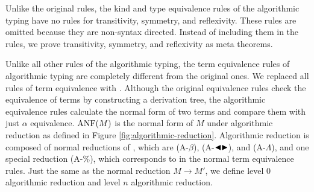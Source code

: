 \begin{center}
    {\small
     \hfil
    }
\end{center}


Unlike the original rules, the kind and type equivalence rules of the
algorithmic typing have no rules for transitivity, symmetry, and reflexivity.
These rules are omitted because they are non-syntax directed. Instead of
including them in the rules, we prove transitivity, symmetry, and reflexivity
as meta theorems.


Unlike all other rules of the algorithmic typing, the term equivalence rules of algorithmic typing are completely different from the original ones. We replaced all rules of term equivalence with \QAANF. Although the original equivalence rules check the equivalence of terms by constructing a derivation tree, the algorithmic equivalence rules calculate the normal form of two terms and compare them with just \( \alpha \) equivalence. \( \text{ANF}(M) \) is the normal form of \( M \) under algorithmic reduction as defined in Figure \ref{fig:algorithmic-reduction}. Algorithmic reduction is composed of normal reductions of \LMD, which are \textsc{(A-$\beta$)}, \textsc{(A-${\mathop{\blacktriangleleft}}{\mathop{\blacktriangleright}}$)}, and \textsc{(A-$\Lambda$)}, and one special reduction \textsc{(A-$\%$)}, which corresponds to \QPercent in the normal term equivalence rules. Just the same as the normal reduction \( M \longrightarrow M' \), we define level 0 algorithmic reduction and level \( n \) algorithmic reduction.  

\begin{center}
\end{center}

